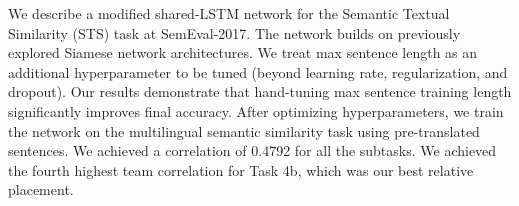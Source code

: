 We describe a modified shared-LSTM network for the Semantic Textual Similarity (STS) task at SemEval-2017. The network builds on previously explored Siamese network architectures. We treat max sentence length as an additional hyperparameter to be tuned (beyond learning rate, regularization, and dropout). Our results demonstrate that hand-tuning max sentence training length significantly improves final accuracy. After optimizing hyperparameters, we train the network on the multilingual semantic similarity task using pre-translated sentences. We achieved a correlation of 0.4792 for all the subtasks.  We achieved the fourth highest team correlation for Task 4b, which was our best relative placement.
